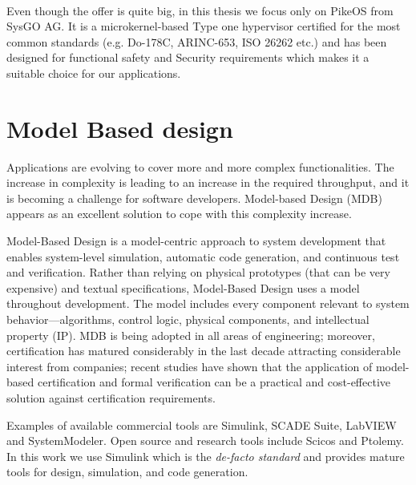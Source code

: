 \paragraph{} Even though the offer is quite big, in this thesis we focus only on PikeOS \cite{PikeOS} from SysGO AG. It is a microkernel-based Type one hypervisor certified for the most common standards (e.g. Do-178C, ARINC-653, ISO 26262 etc.) and has been designed for functional safety and Security requirements which makes it a suitable choice for our applications.

\section{Model Based design}

Applications are evolving to cover more and more complex functionalities. The increase in complexity is leading to an increase in the required throughput, and it is becoming a challenge for software developers. Model-based Design (MDB) appears as an excellent solution to cope with this complexity increase.
\par Model-Based Design is a model-centric approach to system development that enables system-level simulation, automatic code generation, and continuous test and verification. Rather than relying on physical prototypes (that can be very expensive) and textual specifications, Model-Based Design uses a model throughout development. The model includes every component relevant to system behavior—algorithms, control logic, physical components, and intellectual property (IP). MDB is being adopted in all areas of engineering; moreover, certification has matured considerably in the last decade attracting considerable interest from companies; recent studies \cite{mbdaerospaceverification} have shown that the application of model-based certification and formal verification can be a practical and cost-effective solution against certification requirements.
\par Examples of available commercial tools are Simulink\textregistered \cite{Simulink}, SCADE Suite\textregistered \cite{Scade}, LabVIEW\textregistered \cite{Labview} and SystemModeler\textregistered \cite{Modeler}. Open source and research tools include Scicos \cite{Scicos} and Ptolemy\cite{Ptolemy}. In this work we use Simulink which is the \emph{de-facto standard} and provides mature tools for design, simulation, and code generation.

